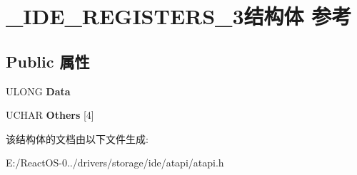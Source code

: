 \hypertarget{struct___i_d_e___r_e_g_i_s_t_e_r_s__3}{}\section{\+\_\+\+I\+D\+E\+\_\+\+R\+E\+G\+I\+S\+T\+E\+R\+S\+\_\+3结构体 参考}
\label{struct___i_d_e___r_e_g_i_s_t_e_r_s__3}
\subsection*{Public 属性}
\begin{DoxyCompactItemize}
\item 
\mbox{\label{struct___i_d_e___r_e_g_i_s_t_e_r_s__3_ac02a55acc1b31d3f0879760bab8c7008}} 
U\+L\+O\+NG {\bfseries Data}
\item 
\mbox{\label{struct___i_d_e___r_e_g_i_s_t_e_r_s__3_a0b5beb3735bcabd04bf9763ab3db914c}} 
U\+C\+H\+AR {\bfseries Others} \mbox{[}4\mbox{]}
\end{DoxyCompactItemize}


该结构体的文档由以下文件生成\+:\begin{DoxyCompactItemize}
\item 
E\+:/\+React\+O\+S-\/0../drivers/storage/ide/atapi/atapi.\+h\end{DoxyCompactItemize}

